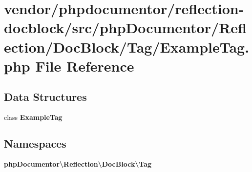 \section{vendor/phpdocumentor/reflection-\/docblock/src/php\+Documentor/\+Reflection/\+Doc\+Block/\+Tag/\+Example\+Tag.php File Reference}
\label{_example_tag_8php}
\subsection*{Data Structures}
\begin{DoxyCompactItemize}
\item 
class {\bf Example\+Tag}
\end{DoxyCompactItemize}
\subsection*{Namespaces}
\begin{DoxyCompactItemize}
\item 
 {\bf php\+Documentor\textbackslash{}\+Reflection\textbackslash{}\+Doc\+Block\textbackslash{}\+Tag}
\end{DoxyCompactItemize}
